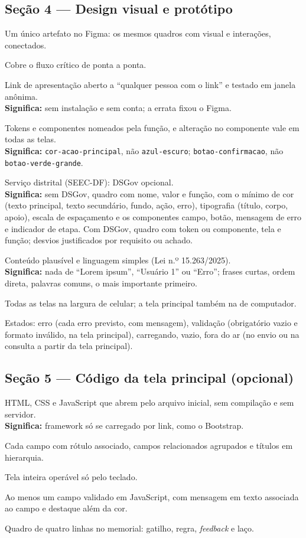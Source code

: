 \documentclass[11pt,a4paper]{article}
\newcommand{\obs}[1]{\\{\small\color{cinza}\textbf{Significa:} #1}}
\begin{document}
\subsection{Seção 4 --- Design visual e protótipo}
\begin{checks}
  \item Um único artefato no Figma: os mesmos quadros com visual e interações, conectados.
  \item Cobre o fluxo crítico de ponta a ponta.
  \item Link de apresentação aberto a ``qualquer pessoa com o link'' e testado em janela anônima.
    \obs{sem instalação e sem conta; a errata fixou o Figma.}
  \item Tokens e componentes nomeados pela função, e alteração no componente vale em todas as telas.
    \obs{\texttt{cor-acao-principal}, não \texttt{azul-escuro}; \texttt{botao-confirmacao}, não \texttt{botao-verde-grande}.}
  \item Serviço distrital (SEEC-DF): DSGov opcional.
    \obs{sem DSGov, quadro com nome, valor e função, com o mínimo de cor (texto principal, texto secundário, fundo, ação, erro), tipografia (título, corpo, apoio), escala de espaçamento e os componentes campo, botão, mensagem de erro e indicador de etapa. Com DSGov, quadro com token ou componente, tela e função; desvios justificados por requisito ou achado.}
  \item Conteúdo plausível e linguagem simples (Lei n.º 15.263/2025).
    \obs{nada de ``Lorem ipsum'', ``Usuário 1'' ou ``Erro''; frases curtas, ordem direta, palavras comuns, o mais importante primeiro.}
  \item Todas as telas na largura de celular; a tela principal também na de computador.
  \item Estados: erro (cada erro previsto, com mensagem), validação (obrigatório vazio e formato inválido, na tela principal), carregando, vazio, fora do ar (no envio ou na consulta a partir da tela principal).
\end{checks}

\subsection{Seção 5 --- Código da tela principal (opcional)}
\begin{checks}
  \item HTML, CSS e JavaScript que abrem pelo arquivo inicial, sem compilação e sem servidor.
    \obs{framework só se carregado por link, como o Bootstrap.}
  \item Cada campo com rótulo associado, campos relacionados agrupados e títulos em hierarquia.
  \item Tela inteira operável só pelo teclado.
  \item Ao menos um campo validado em JavaScript, com mensagem em texto associada ao campo e destaque além da cor.
  \item Quadro de quatro linhas no memorial: gatilho, regra, \textit{feedback} e laço.
\end{checks}
\end{document}
